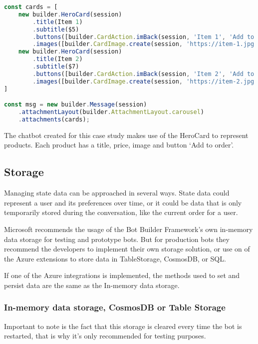 \begin{lstlisting}[language=JavaScript,caption={Example of how to construct some HeroCards and display them in a carousel},label={listing:send-hero-card}]
const cards = [
	new builder.HeroCard(session)
		.title(Item 1)
		.subtitle($5)
		.buttons([builder.CardAction.imBack(session, 'Item 1', 'Add to order')])
		.images([builder.CardImage.create(session, 'https://item-1.jpg')])),
	new builder.HeroCard(session)
		.title(Item 2)
		.subtitle($7)
		.buttons([builder.CardAction.imBack(session, 'Item 2', 'Add to order')])
		.images([builder.CardImage.create(session, 'https://item-2.jpg')])),
]

const msg = new builder.Message(session)
	.attachmentLayout(builder.AttachmentLayout.carousel)
	.attachments(cards);
\end{lstlisting}

The chatbot created for this case study makes use of the HeroCard to represent products. Each product has a title, price, image and button `Add to order'.

\newpage

\subsection{Storage}

Managing state data can be approached in several ways. State data could represent a user and its preferences over time, or it could be data that is only temporarily stored during the conversation, like the current order for a user.

Microsoft recommends the usage of the Bot Builder Framework's own in-memory data storage for testing and prototype bots. But for production bots they recommend the developers to implement their own storage solution, or use on of the Azure extensions to store data in \Gls{TableStorage}\cite{table-storage}, \Gls{CosmosDB}\cite{cosmosdb}, or SQL.

If one of the Azure integrations is implemented, the methods used to set and persist data are the same as the In-memory data storage.

\subsubsection{In-memory data storage, CosmosDB or Table Storage}

Important to note is the fact that this storage is cleared every time the bot is restarted, that is why it's only recommended for testing purposes.

